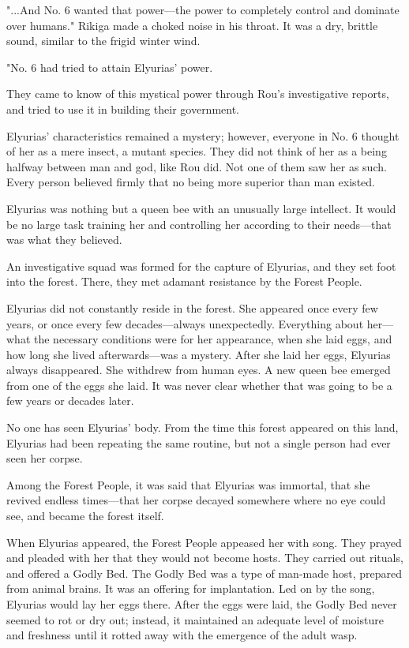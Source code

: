 "...And No. 6 wanted that power---the power to completely control and
dominate over humans." Rikiga made a choked noise in his throat. It was
a dry, brittle sound, similar to the frigid winter wind.

"No. 6 had tried to attain Elyurias' power.

They came to know of this mystical power through Rou's investigative
reports, and tried to use it in building their government.

Elyurias' characteristics remained a mystery; however, everyone in No. 6
thought of her as a mere insect, a mutant species. They did not think of
her as a being halfway between man and god, like Rou did. Not one of
them saw her as such. Every person believed firmly that no being more
superior than man existed.

Elyurias was nothing but a queen bee with an unusually large intellect.
It would be no large task training her and controlling her according to
their needs---that was what they believed.

An investigative squad was formed for the capture of Elyurias, and they
set foot into the forest. There, they met adamant resistance by the
Forest People.

Elyurias did not constantly reside in the forest. She appeared once
every few years, or once every few decades---always unexpectedly.
Everything about her---what the necessary conditions were for her
appearance, when she laid eggs, and how long she lived afterwards---was a
mystery. After she laid her eggs, Elyurias always disappeared. She
withdrew from human eyes. A new queen bee emerged from one of the eggs
she laid. It was never clear whether that was going to be a few years or
decades later.

No one has seen Elyurias' body. From the time this forest appeared on
this land, Elyurias had been repeating the same routine, but not a
single person had ever seen her corpse.

Among the Forest People, it was said that Elyurias was immortal, that
she revived endless times---that her corpse decayed somewhere where no eye
could see, and became the forest itself.

When Elyurias appeared, the Forest People appeased her with song. They
prayed and pleaded with her that they would not become hosts. They
carried out rituals, and offered a Godly Bed. The Godly Bed was a type
of man-made host, prepared from animal brains. It was an offering for
implantation. Led on by the song, Elyurias would lay her eggs there.
After the eggs were laid, the Godly Bed never seemed to rot or dry out;
instead, it maintained an adequate level of moisture and freshness until
it rotted away with the emergence of the adult wasp.

